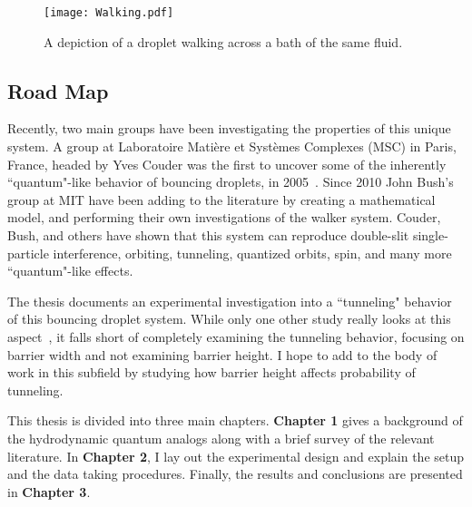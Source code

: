 \begin{figure}[h!]
	\centering
	\texttt{[image: Walking.pdf]}
	\caption{A depiction of a droplet walking across a bath of the same fluid.}
	\label{bounce}
\end{figure}
	    
	  
\subsection{Road Map}	  
	  
	Recently, two main groups have been investigating the properties of this unique system. A group at Laboratoire Mati\`{e}re et Syst\`{e}mes Complexes (MSC) in Paris, France, headed by Yves Couder was the first to uncover some of the inherently ``quantum"-like behavior of bouncing droplets, in 2005~\cite{Couder2005b}. Since 2010 John Bush's group at MIT have been adding to the literature by creating a mathematical model, and performing their own investigations of the walker system. Couder, Bush, and others have shown that this system can reproduce double-slit single-particle interference, orbiting, tunneling, quantized orbits, spin, and many more ``quantum"-like effects. 
		
	The thesis documents an experimental investigation into a ``tunneling" behavior of this bouncing droplet system. While only one other study really looks at this aspect~\cite{tunneling}, it falls short of completely examining the tunneling behavior, focusing on barrier width and not examining barrier height. I hope to add to the body of work in this subfield by studying how barrier height affects probability of tunneling.   
	
	This thesis is divided into three main chapters. \textbf{Chapter 1} gives a background of the hydrodynamic quantum analogs along with a brief survey of the relevant literature. In \textbf{Chapter 2}, I lay out the experimental design and explain the setup and the data taking procedures. Finally, the results and conclusions are presented in \textbf{Chapter 3}.	    